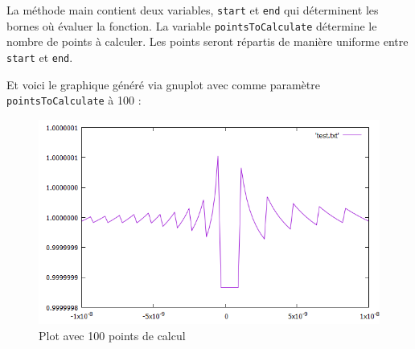 La méthode main contient deux variables, \texttt{start} et \texttt{end} qui déterminent les bornes où évaluer la fonction. La variable \texttt{pointsToCalculate} détermine le nombre de points à calculer. Les points seront répartis de manière uniforme entre \texttt{start} et \texttt{end}.


Et voici le graphique généré via gnuplot avec comme paramètre \texttt{pointsToCalculate} à 100 :

\begin{figure}[H]
	\caption{\label{ex} Plot avec 100 points de calcul}
	\centering
	\includegraphics[scale = 0.6]{1_plot.png}
\end{figure}
